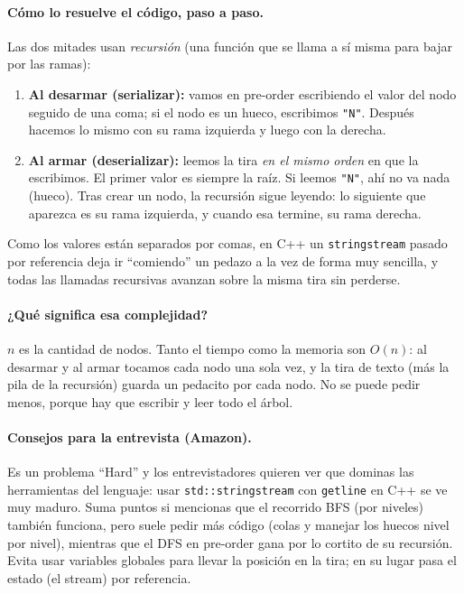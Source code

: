 \paragraph{Cómo lo resuelve el código, paso a paso.} Las dos mitades usan
\emph{recursión} (una función que se llama a sí misma para bajar por las ramas):
\begin{enumerate}
    \item \textbf{Al desarmar (serializar):} vamos en pre-order escribiendo el valor del nodo seguido de una coma; si el nodo es un hueco, escribimos \texttt{"N"}. Después hacemos lo mismo con su rama izquierda y luego con la derecha.
    \item \textbf{Al armar (deserializar):} leemos la tira \emph{en el mismo orden} en que la escribimos. El primer valor es siempre la raíz. Si leemos \texttt{"N"}, ahí no va nada (hueco). Tras crear un nodo, la recursión sigue leyendo: lo siguiente que aparezca es su rama izquierda, y cuando esa termine, su rama derecha.
\end{enumerate}
Como los valores están separados por comas, en C++ un \texttt{stringstream}
pasado por referencia deja ir ``comiendo'' un pedazo a la vez de forma muy
sencilla, y todas las llamadas recursivas avanzan sobre la misma tira sin
perderse.




\paragraph{¿Qué significa esa complejidad?} $n$ es la cantidad de nodos. Tanto el
tiempo como la memoria son $O(n)$: al desarmar y al armar tocamos cada nodo una
sola vez, y la tira de texto (más la pila de la recursión) guarda un pedacito por
cada nodo. No se puede pedir menos, porque hay que escribir y leer todo el árbol.

\paragraph{Consejos para la entrevista (Amazon).} Es un problema ``Hard'' y los
entrevistadores quieren ver que dominas las herramientas del lenguaje: usar
\texttt{std::stringstream} con \texttt{getline} en C++ se ve muy maduro. Suma
puntos si mencionas que el recorrido BFS (por niveles) también funciona, pero
suele pedir más código (colas y manejar los huecos nivel por nivel), mientras
que el DFS en pre-order gana por lo cortito de su recursión. Evita usar variables
globales para llevar la posición en la tira; en su lugar pasa el estado (el
stream) por referencia.
